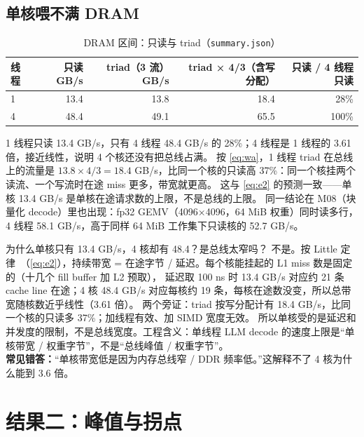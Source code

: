 \documentclass[11pt,a4paper]{ctexart}
\begin{document}
\subsection{单核喂不满 DRAM}\label{sec:triad}

\begin{table}[H]
\centering\small
\caption{DRAM 区间：只读与 triad（\texttt{summary.json}）}\label{tab:triad}
\begin{tabular}{lrrrr}
\toprule
线程 & 只读 GB/s & triad（3 流）GB/s & triad × 4/3（含写分配） & 只读 / 4 线程只读 \\
\midrule
1 & 13.4 & 13.8 & 18.4 & 28\% \\
4 & 48.4 & 49.1 & 65.5 & 100\% \\
\bottomrule
\end{tabular}
\end{table}

1 线程只读 13.4 GB/s，只有 4 线程 48.4 GB/s 的 28\%；4 线程是 1 线程的 3.61 倍，接近线性，说明 4 个核还没有把总线占满。
按 \cref{eq:wa}，1 线程 triad 在总线上的流量是 $13.8 \times 4/3 = 18.4$ GB/s，比同一个核的只读高 37\%：同一个核挂两个读流、一个写流时在途 miss 更多，带宽就更高。
这与 \cref{eq:e2} 的预测一致——单核 13.4 GB/s 是单核在途请求数的上限，不是总线的上限。
同一结论在 M08（块量化 decode）里也出现：fp32 GEMV（4096×4096，64 MiB 权重）同时读多行，4 线程 58.1 GB/s，高于同样 64 MiB 工作集下只读核的 52.7 GB/s。

\begin{iqbox}{为什么单核只有 13.4 GB/s，4 核却有 48.4？是总线太窄吗？}
不是。按 Little 定律~\cite{little}（\cref{eq:e2}），持续带宽 = 在途字节 / 延迟。每个核能挂起的 L1 miss 数是固定的（十几个 fill buffer 加 L2 预取），
延迟取 100 ns 时 13.4 GB/s 对应约 21 条 cache line 在途；4 核 48.4 GB/s 对应每核约 19 条，每核在途数没变，所以总带宽随核数近乎线性（3.61 倍）。
两个旁证：triad 按写分配计有 18.4 GB/s，比同一个核的只读多 37\%；加线程有效、加 SIMD 宽度无效。
所以单核受的是延迟和并发度的限制，不是总线宽度。工程含义：单线程 LLM decode 的速度上限是“单核带宽 / 权重字节”，不是“总线峰值 / 权重字节”。
\\[2pt]\textbf{常见错答：}“单核带宽低是因为内存总线窄 / DDR 频率低。”这解释不了 4 核为什么能到 3.6 倍。
\end{iqbox}

\section{结果二：峰值与拐点}\label{sec:peaks}
\end{document}
